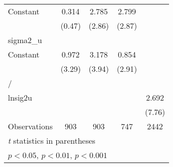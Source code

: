 {\begin{longtable}{l*{4}{c}}
Constant        &    0.314         &    2.785\sym{**} &    2.799\sym{**} &                  \\
                &   (0.47)         &   (2.86)         &   (2.87)         &                  \\
\hline
sigma2\_u        &                  &                  &                  &                  \\
Constant        &    0.972\sym{***}&    3.178\sym{***}&    0.854\sym{**} &                  \\
                &   (3.29)         &   (3.94)         &   (2.91)         &                  \\
\hline
/               &                  &                  &                  &                  \\
lnsig2u         &                  &                  &                  &    2.692\sym{***}\\
                &                  &                  &                  &   (7.76)         \\
\hline
Observations    &      903         &      903         &      747         &     2442         \\
\hline\hline
\multicolumn{5}{l}{\footnotesize \textit{t} statistics in parentheses}\\
\multicolumn{5}{l}{\footnotesize \sym{*} \(p<0.05\), \sym{**} \(p<0.01\), \sym{***} \(p<0.001\)}\\
\end{longtable}
}
